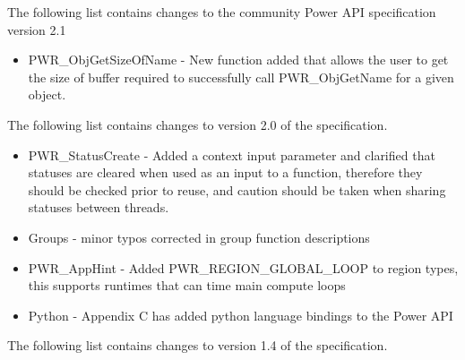 The following list contains changes to the community Power API specification version 2.1
\begin{itemize}
  \item{PWR_ObjGetSizeOfName - New function added that allows the user to get the size of buffer required to successfully call PWR_ObjGetName for a given object.}

\end{itemize}


The following list contains changes to version 2.0 of the specification.
\begin{itemize}
  \item{PWR_StatusCreate - Added a context input parameter and clarified that statuses are cleared when used as an input to a function, therefore they should be checked prior to reuse, and caution should be taken when sharing statuses between threads.}
  \item{Groups - minor typos corrected in group function descriptions}
  \item{PWR_AppHint - Added PWR_REGION_GLOBAL_LOOP to region types, this supports runtimes that can time main compute loops}
  \item{Python - Appendix C has added python language bindings to the Power API}

\end{itemize}


The following list contains changes to version 1.4 of the specification.

